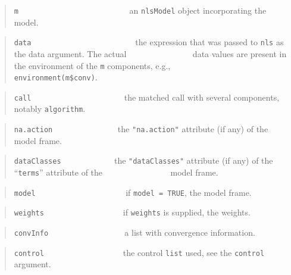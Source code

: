 \begin{quote}
\texttt{m} ~ ~ ~ ~ ~ ~ ~ ~ ~ ~ ~ ~ ~ ~ ~~ an \texttt{nlsModel} object incorporating the model.
\end{quote}

\begin{quote}
\texttt{data} ~ ~ ~ ~ ~ ~ ~ ~ ~ ~ ~ ~ ~ ~ ~the expression that was passed to \texttt{nls} as the data argument. The actual \newline
\(~~~~~~~~~~~~~~~~~~~~~~~~~~~~~~~~~\) data values are present in the environment of the \texttt{m} components, e.g., \newline \(~~~~~~~~~~~~~~~~~~~~~~~~~~~~~~~~~\) \texttt{environment(m\$conv)}.
\end{quote}

\begin{quote}
\texttt{call} ~ ~ ~ ~ ~ ~ ~ ~ ~ ~ ~ ~ ~ the matched call with several components, notably \texttt{algorithm}.
\end{quote}

\begin{quote}
\texttt{na.action} ~ ~ ~ ~ ~ ~ ~ ~ ~ the \texttt{"na.action"} attribute (if any) of the model frame.
\end{quote}

\begin{quote}
\texttt{dataClasses} ~ ~ ~ ~ ~ ~ ~ \(~\)the \texttt{"dataClasses"} attribute (if any) of the ``\texttt{terms}'' attribute of the \newline
\(~~~~~~~~~~~~~~~~~~~~~~~~~~~~~~~~~~\) model frame.
\end{quote}

\begin{quote}
\texttt{model} ~ ~ ~ ~ ~ ~ ~ ~ ~ ~ ~ ~ ~if \texttt{model\ =\ TRUE}, the model frame.
\end{quote}

\begin{quote}
\texttt{weights} ~ ~ ~ ~ ~ ~ ~ ~ ~ ~ ~ if \texttt{weights} is supplied, the weights.
\end{quote}

\begin{quote}
\texttt{convInfo} ~ ~ ~ ~ ~ ~ ~ ~ ~ ~~ a list with convergence information.
\end{quote}

\begin{quote}
\texttt{control} ~ ~ ~ ~ ~ ~ ~ ~ ~ ~ ~ the control \texttt{list} used, see the \texttt{control} argument.
\end{quote}

